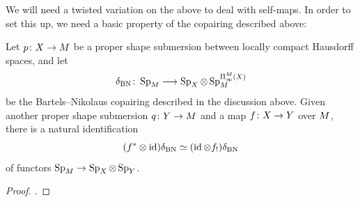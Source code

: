 We will need a twisted variation on the above to deal with self-maps. In order to set this up, we need a basic property of the copairing described above:
\begin{lem}
  Let $p\colon X\to M$ be a proper shape submersion between locally compact Hausdorff spaces, and let
  \[
    \delta_{\mathrm{BN}}\colon\Sp_\base\too\D\tset\otimes\Sp_\base^{\ani{\tset}[\base]}
  \]
  be the Bartels--Nikolaus copairing described in the discussion above. Given another proper shape submersion $q\colon Y\to M$ and a map $f\colon X\to Y$ over $M$, there is a natural identification
  \[
    (f^*\otimes\operatorname{id} )\delta_{\mathrm{BN}}\simeq (\operatorname{id}\otimes f_!)\delta_{\mathrm{BN}}
  \]
  of functors $\operatorname{Sp}_M\to\operatorname{Sp}_{X}\otimes\operatorname{Sp}_{Y}$.
\end{lem}
\begin{proof}
  .
\end{proof}
